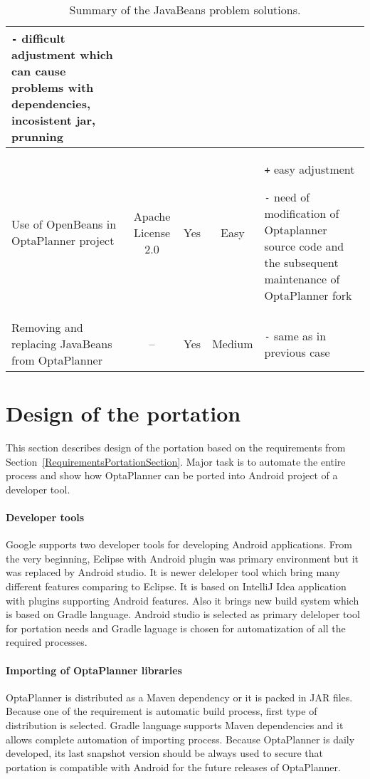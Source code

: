 \begin {table}[h!]
{\begin{tabular}{|l|c|c|c|p{5cm}|}
            \texttt{-} difficult adjustment which can cause problems with dependencies, incosistent jar, prunning
            \\ \hline

            \multicolumn{1}{|p{2.5cm}|}{Use of OpenBeans in OptaPlanner project} &
            \multicolumn{1}{p{2cm}|}{\centering Apache License 2.0} &
            Yes &
            Easy &
            \texttt{+} easy adjustment

            \texttt{-} need of modification of Optaplanner source code and the subsequent maintenance of
            OptaPlanner fork \\ \hline

            \multicolumn{1}{|p{2.5cm}|}{Removing and replacing JavaBeans from OptaPlanner} &
            -- &
            Yes &
            Medium &
            \texttt{-} same as in previous case\\ \hline
        \end{tabular}
    }
    \centering
    \caption{Summary of the JavaBeans problem solutions.}
    \label{SummaryJavaBeansTable}
\end{table}

\section{Design of the portation}\label{PortationDesignSection}
This section describes design of the portation based on the requirements from
Section~\ref{RequirementsPortationSection}. Major task is to automate the entire process and show how OptaPlanner can be
ported into Android project of a developer tool.

\paragraph{Developer tools}
Google supports two developer tools for developing Android applications. From the very beginning, Eclipse with Android
plugin was primary environment but it was replaced by Android studio. It is newer deleloper tool which bring many
different features comparing to Eclipse. It is based on IntelliJ Idea application with plugins supporting Android
features. Also it brings new build system which is based on Gradle language. Android studio is selected as primary
deleloper tool for portation needs and Gradle laguage is chosen for automatization of all the required processes.

\paragraph{Importing of OptaPlanner libraries}
OptaPlanner is distributed as a Maven dependency or it is packed in JAR files. Because one of the requirement is
automatic build process, first type of distribution is selected. Gradle language supports Maven dependencies and it
allows complete automation of importing process. Because OptaPlanner is daily developed, its last snapshot version
should be always used to secure that portation is compatible with Android for the future releases of OptaPlanner.

